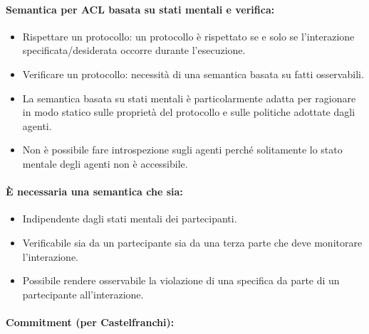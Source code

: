 \paragraph{Semantica per ACL basata su stati mentali e verifica:}

\begin{itemize}
  \item Rispettare un protocollo: un protocollo è rispettato se e solo se l'interazione specificata/desiderata occorre durante l'esecuzione. 
  \item Verificare un protocollo: necessità di una semantica basata su fatti osservabili.
  \item La semantica basata su stati mentali è particolarmente adatta per ragionare in modo statico sulle proprietà del protocollo e sulle politiche adottate dagli agenti. 
  \item Non è possibile fare introspezione sugli agenti perché solitamente lo stato mentale degli agenti non è accessibile.
\end{itemize}

\paragraph{È necessaria una semantica che sia:}

\begin{itemize}
  \item Indipendente dagli stati mentali dei partecipanti.
  \item Verificabile sia da un partecipante sia da una terza parte che deve monitorare l'interazione. 
  \item Possibile rendere osservabile la violazione di una specifica da parte di un partecipante all'interazione. 
\end{itemize}



\paragraph{Commitment (per Castelfranchi):}

